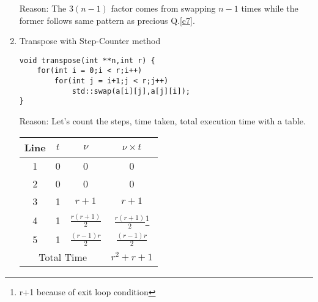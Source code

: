 \documentclass[./AlgorithmDesign.tex]{subfiles}
\begin{document}
\begin{enumerate}
\begin{mdframed}
Reason: The $3(n-1)$ factor comes from swapping $n-1$ times while the former follows same pattern as precious Q.\ref{c7}.
\end{mdframed}

\item Transpose with Step-Counter method
\begin{mdframed}
\begin{lstlisting}[label=c9]
void transpose(int **n,int r) {
    for(int i = 0;i < r;i++)
        for(int j = i+1;j < r;j++)
            std::swap(a[i][j],a[j][i]);
}
\end{lstlisting}
\vspace{3mm}

Reason: 
Let's count the steps, time taken, total execution time with a table.

\begin{center}
\begin{tabular}{|c|c|c|c|}
\hline
Line & $t$ & $\nu$ & $\nu\times t$  \\
\hline
1 & 0 & 0 & 0 \\
2 & 0 & 0 & 0 \\
3 & 1 & $r+1$ & $r+1$ \\
4 & 1 & $\frac{r(r+1)}{2}$ & $\frac{r(r+1)}{2}$\footnote{r+1 because of exit loop condition} \\
5 & 1 & $\frac{(r-1)r}{2}$ & $\frac{(r-1)r}{2}$ \\
\hline
\multicolumn{3}{|c|}{Total Time} & $r^2+r+1$\\
\hline
\end{tabular}
\end{center}
\end{mdframed}
\end{enumerate}
\end{document}
